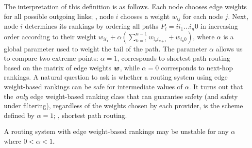 The interpretation of this definition is as follows.  Each
node chooses edge weights for all possible outgoing links; \ie, node
$i$ chooses a weight 
$w_{ij}$ for each node $j$.  Next, node $i$ determines its rankings
by ordering all paths $P_i = i i_1 \ldots i_n 0$ in increasing order
according to their weight $w_{ii_1} + \alpha ( \sum_{k = 1}^{n-1} w_{i_k
i_{k+1}} + w_{i_n 0})$, where $\alpha$ is a global parameter used to
weight the tail of the path.  The parameter $\alpha$ allows us to
compare two extreme points: $\alpha = 1$, corresponds to shortest path
routing based on the matrix of edge weights 
$\boldsymbol{w}$, while $\alpha = 0$ corresponds to next-hop rankings.
%
%
%
A natural question to ask is whether a routing system using edge
weight-based rankings can be safe for intermediate values of
$\alpha$.  It turns out that the {\em only} edge weight-based ranking
class that can guarantee safety (and safety under filtering), regardless
of the weights chosen by each provider, is the scheme defined
by $\alpha = 1$; \ie, shortest path routing.


\begin{observation}
A routing system with edge weight-based rankings may be unstable
for any $\alpha$ where $0  < \alpha < 1$.
\end{observation}

